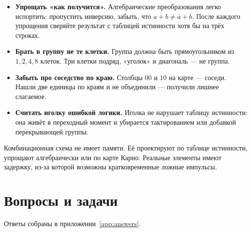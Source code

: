 \begin{warnbox}
\begin{itemize}
  \item \textbf{Упрощать «как получится».} Алгебраические преобразования
        легко испортить: пропустить инверсию, забыть, что $\overline{a+b}\neq\overline a+\overline b$.
        После каждого упрощения сверяйте результат с таблицей истинности
        хотя бы на трёх строках.
  \item \textbf{Брать в группу не те клетки.} Группа должна быть
        прямоугольником из $1,2,4,8$ клеток. Три клетки подряд, «уголок»
        и диагональ --- не группа.
  \item \textbf{Забыть про соседство по краю.} Столбцы $00$ и $10$ на
        карте --- соседи. Нашли две единицы по краям и не объединили --- получили
        лишнее слагаемое.
  \item \textbf{Считать иголку ошибкой логики.} Иголка не нарушает
        таблицу истинности: она живёт в переходный момент и убирается
        тактированием или добавкой перекрывающей группы.
\end{itemize}
\end{warnbox}

\begin{ideabox}
Комбинационная схема не имеет памяти. Её проектируют по таблице истинности,
упрощают алгебраически или по карте Карно. Реальные элементы имеют
задержку, из-за которой возможны кратковременные ложные импульсы.
\end{ideabox}

\section{Вопросы и задачи}
\label{sec:tasks-comb}

Ответы собраны в приложении~\ref{app:answers}.

